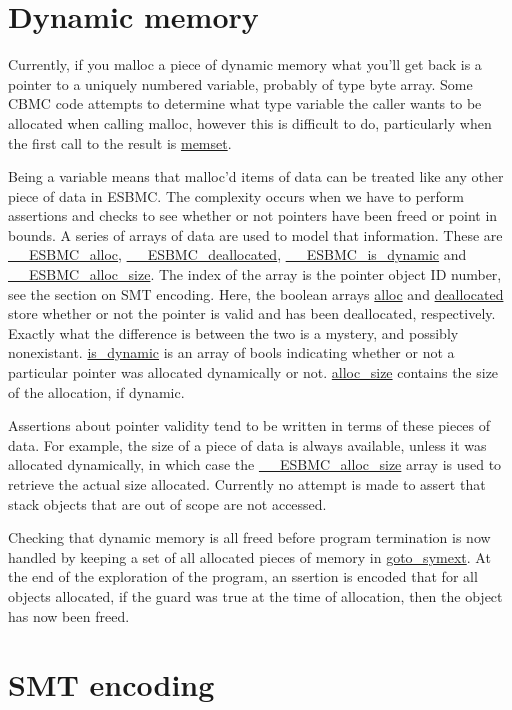 \documentclass{article}
\begin{document}
\section{Dynamic memory}

Currently, if you malloc a piece of dynamic memory what you'll get
back is a pointer to a uniquely numbered variable, probably of type byte array.
Some CBMC code attempts to determine what type variable the caller wants to be
allocated when calling malloc, however this is difficult to do, particularly
when the first call to the result is \url{memset}.

Being a variable means that malloc'd items of data can be treated like any other
piece of data in ESBMC. The complexity occurs when we have to perform assertions
and checks to see whether or not pointers have been freed or point in bounds.
A series of arrays of data are used to model that information. These are
\url{__ESBMC_alloc}, \url{__ESBMC_deallocated},
\url{__ESBMC_is_dynamic} and \url{__ESBMC_alloc_size}.
The index of the array is the pointer object ID number, see the section on
SMT encoding. Here, the boolean arrays \url{alloc} and \url{deallocated}
store whether or not the pointer is valid and has been deallocated,
respectively. Exactly what the difference is between the two is a mystery,
and possibly nonexistant. \url{is_dynamic} is an array of bools indicating
whether or not a particular pointer was allocated dynamically or not.
\url{alloc_size} contains the size of the allocation, if dynamic.

Assertions about pointer validity tend to be written in terms of these pieces
of data. For example, the size of a piece of data is always available, unless
it was allocated dynamically, in which case the \url{__ESBMC_alloc_size}
array is used to retrieve the actual size allocated. Currently no attempt is
made to assert that stack objects that are out of scope are not accessed.

Checking that dynamic memory is all freed before program termination is now
handled by keeping a set of all allocated pieces of memory in
\url{goto_symext}. At the end of the exploration of the program, an
ssertion is encoded that for all objects allocated, if the guard was true
at the time of allocation, then the object has now been freed.

\section{SMT encoding}
\end{document}
